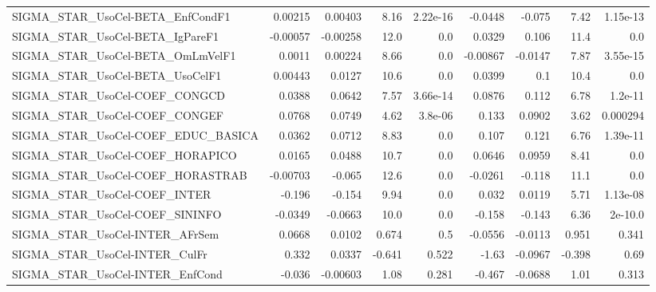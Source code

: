 \begin{tabular}{lrrrrrrrr}
SIGMA\_STAR\_UsoCel-BETA\_EnfCondF1      &     0.00215 &      0.00403 &    8.16 & 2.22e-16 &    -0.0448 &      -0.075 &         7.42 &      1.15e-13 \\
SIGMA\_STAR\_UsoCel-BETA\_IgPareF1       &    -0.00057 &     -0.00258 &    12.0 &      0.0 &     0.0329 &       0.106 &         11.4 &           0.0 \\
SIGMA\_STAR\_UsoCel-BETA\_OmLmVelF1      &      0.0011 &      0.00224 &    8.66 &      0.0 &   -0.00867 &     -0.0147 &         7.87 &      3.55e-15 \\
SIGMA\_STAR\_UsoCel-BETA\_UsoCelF1       &     0.00443 &       0.0127 &    10.6 &      0.0 &     0.0399 &         0.1 &         10.4 &           0.0 \\
SIGMA\_STAR\_UsoCel-COEF\_CONGCD         &      0.0388 &       0.0642 &    7.57 & 3.66e-14 &     0.0876 &       0.112 &         6.78 &       1.2e-11 \\
SIGMA\_STAR\_UsoCel-COEF\_CONGEF         &      0.0768 &       0.0749 &    4.62 &  3.8e-06 &      0.133 &      0.0902 &         3.62 &      0.000294 \\
SIGMA\_STAR\_UsoCel-COEF\_EDUC\_BASICA    &      0.0362 &       0.0712 &    8.83 &      0.0 &      0.107 &       0.121 &         6.76 &      1.39e-11 \\
SIGMA\_STAR\_UsoCel-COEF\_HORAPICO       &      0.0165 &       0.0488 &    10.7 &      0.0 &     0.0646 &      0.0959 &         8.41 &           0.0 \\
SIGMA\_STAR\_UsoCel-COEF\_HORASTRAB      &    -0.00703 &       -0.065 &    12.6 &      0.0 &    -0.0261 &      -0.118 &         11.1 &           0.0 \\
SIGMA\_STAR\_UsoCel-COEF\_INTER          &      -0.196 &       -0.154 &    9.94 &      0.0 &      0.032 &      0.0119 &         5.71 &      1.13e-08 \\
SIGMA\_STAR\_UsoCel-COEF\_SININFO        &     -0.0349 &      -0.0663 &    10.0 &      0.0 &     -0.158 &      -0.143 &         6.36 &       2e-10.0 \\
SIGMA\_STAR\_UsoCel-INTER\_AFrSem        &      0.0668 &       0.0102 &   0.674 &      0.5 &    -0.0556 &     -0.0113 &        0.951 &         0.341 \\
SIGMA\_STAR\_UsoCel-INTER\_CulFr         &       0.332 &       0.0337 &  -0.641 &    0.522 &      -1.63 &     -0.0967 &       -0.398 &          0.69 \\
SIGMA\_STAR\_UsoCel-INTER\_EnfCond       &      -0.036 &     -0.00603 &    1.08 &    0.281 &     -0.467 &     -0.0688 &         1.01 &         0.313 \\

\end{tabular}
